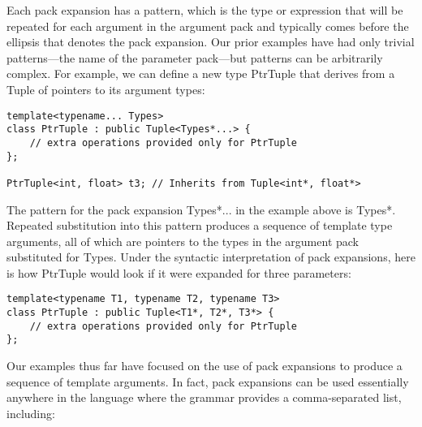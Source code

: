 Each pack expansion has a pattern, which is the type or expression that will be repeated for each argument in the argument pack and typically comes before the ellipsis that denotes the pack expansion. Our prior examples have had only trivial patterns—the name of the parameter pack—but patterns can be arbitrarily complex. For example, we can define a new type PtrTuple that derives from a Tuple of pointers to its argument types:

\begin{lstlisting}[style=styleCXX]
template<typename... Types>
class PtrTuple : public Tuple<Types*...> {
	// extra operations provided only for PtrTuple
};

PtrTuple<int, float> t3; // Inherits from Tuple<int*, float*>
\end{lstlisting}

The pattern for the pack expansion Types*... in the example above is Types*. Repeated substitution into this pattern produces a sequence of template type arguments, all of which are pointers to the types in the argument pack substituted for Types. Under the syntactic interpretation of pack expansions, here is how PtrTuple would look if it were expanded for three parameters:

\begin{lstlisting}[style=styleCXX]
template<typename T1, typename T2, typename T3>
class PtrTuple : public Tuple<T1*, T2*, T3*> {
	// extra operations provided only for PtrTuple
};
\end{lstlisting}


Our examples thus far have focused on the use of pack expansions to produce a sequence of template arguments. In fact, pack expansions can be used essentially anywhere in the language where the grammar provides a comma-separated list, including:

